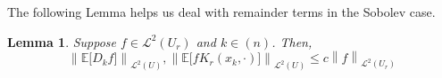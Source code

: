 \documentclass{article}
\newcommand{\norm}[1]{\left \lVert #1 \right \rVert}
\newcommand{\1}{\mathbf{1}}
\newcommand{\Leb}{\mathcal{L}}
\newcommand{\Ebb}{\mathbb{E}}
\theoremstyle{alden}
\theoremstyle{aldenthm}
\newtheorem{lemma}{Lemma}
\theoremstyle{definition}
\theoremstyle{remark}
\begin{document}
The following Lemma helps us deal with remainder terms in the Sobolev case.
\begin{lemma}
	\label{lem:remainder_term_sobolev}
	Suppose $f \in \Leb^2(U_r)$ and $k \in (n)$. Then,
	\begin{equation*}
	\norm{\Ebb\bigl[D_kf\bigr]}_{\Leb^2(U)}, \norm{\Ebb\bigl[fK_r(x_k,\cdot)\bigr]}_{\Leb^2(U)} \leq c \norm{f}_{\Leb^2(U_r)}
	\end{equation*}
\end{lemma}
\end{document}
